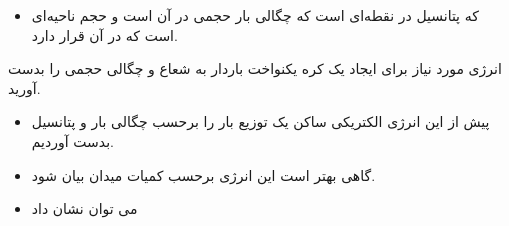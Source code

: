 \begin{ELjoin}

\begin{itemize}
\tightlist
\item
  که  پتانسیل در نقطه‌ای است که چگالی بار حجمی در آن \ELim{\rho} است و  حجم ناحیه‌ای است که \ELim{\rho} در آن قرار دارد.
\end{itemize}


\begin{ELexample}{}

انرژی مورد نیاز برای ایجاد یک کره یکنواخت باردار به شعاع  و چگالی حجمی \ELim{\rho} را بدست آورید.

\begin{ELsolution}


\end{ELsolution}

\end{ELexample}

\end{ELjoin}

\begin{ELunit}

\begin{itemize}
\tightlist
\item
  پیش از این انرژی الکتریکی ساکن یک توزیع بار را برحسب چگالی بار و پتانسیل بدست آوردیم.
\item
  گاهی بهتر است این انرژی برحسب کمیات میدان بیان شود.
\item
  می توان نشان داد
\end{itemize}

\end{ELunit}

